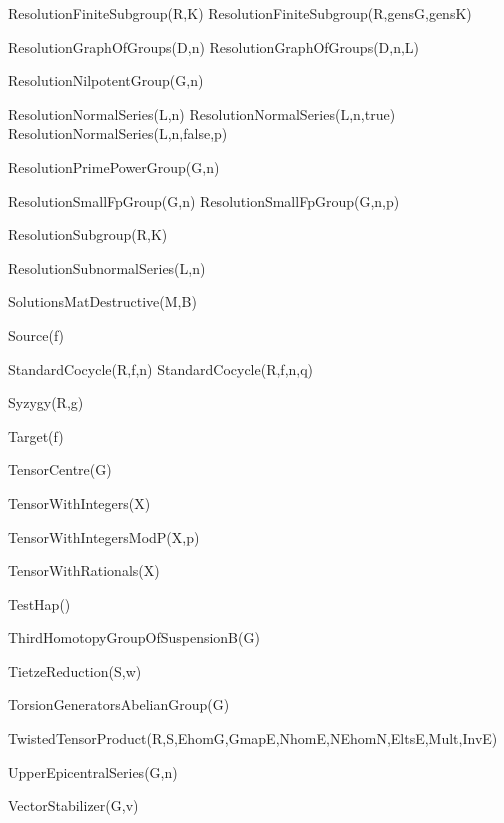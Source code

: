 \>ResolutionFiniteSubgroup(R,K)
\>ResolutionFiniteSubgroup(R,gensG,gensK)

\>ResolutionGraphOfGroups(D,n)
\>ResolutionGraphOfGroups(D,n,L)

\>ResolutionNilpotentGroup(G,n)

\>ResolutionNormalSeries(L,n)
\>ResolutionNormalSeries(L,n,true)
\>ResolutionNormalSeries(L,n,false,p)

\>ResolutionPrimePowerGroup(G,n)

\>ResolutionSmallFpGroup(G,n)
\>ResolutionSmallFpGroup(G,n,p)

\>ResolutionSubgroup(R,K)

\>ResolutionSubnormalSeries(L,n)

\>SolutionsMatDestructive(M,B)

\>Source(f)

\>StandardCocycle(R,f,n)
\>StandardCocycle(R,f,n,q)

\>Syzygy(R,g)

\>Target(f)

\>TensorCentre(G)

\>TensorWithIntegers(X)

\>TensorWithIntegersModP(X,p)

\>TensorWithRationals(X)

\>TestHap()

\>ThirdHomotopyGroupOfSuspensionB(G)

\>TietzeReduction(S,w)

\>TorsionGeneratorsAbelianGroup(G)

\>TwistedTensorProduct(R,S,EhomG,GmapE,NhomE,NEhomN,EltsE,Mult,InvE)

\>UpperEpicentralSeries(G,n)

\>VectorStabilizer(G,v)

